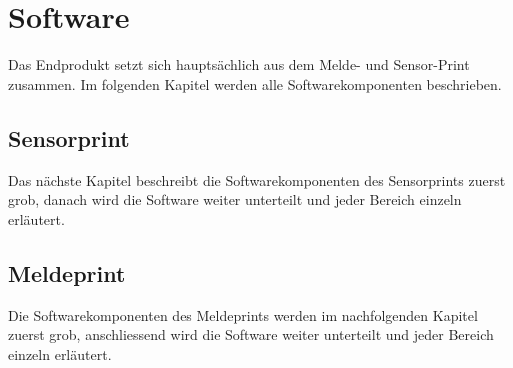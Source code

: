 \section{Software}
Das Endprodukt setzt sich hauptsächlich aus dem Melde- und Sensor-Print zusammen. Im folgenden Kapitel werden alle Softwarekomponenten beschrieben.
\subsection{Sensorprint}
Das nächste Kapitel beschreibt die Softwarekomponenten des Sensorprints zuerst grob, danach wird die Software weiter unterteilt und jeder Bereich einzeln erläutert.
\subsection{Meldeprint}

Die Softwarekomponenten des Meldeprints werden im nachfolgenden Kapitel zuerst grob, anschliessend wird die Software weiter unterteilt und jeder Bereich einzeln erläutert. 

